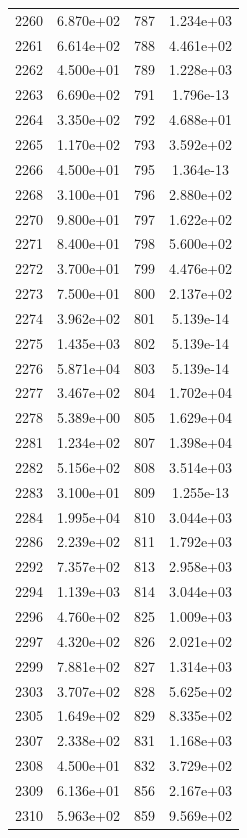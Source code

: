 \documentclass[12pt]{article}
\begin{document}
\begin{longtable}{@{}cccc@{}}
2260 & 6.870e+02 & 787 & 1.234e+03 \\
2261 & 6.614e+02 & 788 & 4.461e+02 \\
2262 & 4.500e+01 & 789 & 1.228e+03 \\
2263 & 6.690e+02 & 791 & 1.796e-13 \\
2264 & 3.350e+02 & 792 & 4.688e+01 \\
2265 & 1.170e+02 & 793 & 3.592e+02 \\
2266 & 4.500e+01 & 795 & 1.364e-13 \\
2268 & 3.100e+01 & 796 & 2.880e+02 \\
2270 & 9.800e+01 & 797 & 1.622e+02 \\
2271 & 8.400e+01 & 798 & 5.600e+02 \\
2272 & 3.700e+01 & 799 & 4.476e+02 \\
2273 & 7.500e+01 & 800 & 2.137e+02 \\
2274 & 3.962e+02 & 801 & 5.139e-14 \\
2275 & 1.435e+03 & 802 & 5.139e-14 \\
2276 & 5.871e+04 & 803 & 5.139e-14 \\
2277 & 3.467e+02 & 804 & 1.702e+04 \\
2278 & 5.389e+00 & 805 & 1.629e+04 \\
2281 & 1.234e+02 & 807 & 1.398e+04 \\
2282 & 5.156e+02 & 808 & 3.514e+03 \\
2283 & 3.100e+01 & 809 & 1.255e-13 \\
2284 & 1.995e+04 & 810 & 3.044e+03 \\
2286 & 2.239e+02 & 811 & 1.792e+03 \\
2292 & 7.357e+02 & 813 & 2.958e+03 \\
2294 & 1.139e+03 & 814 & 3.044e+03 \\
2296 & 4.760e+02 & 825 & 1.009e+03 \\
2297 & 4.320e+02 & 826 & 2.021e+02 \\
2299 & 7.881e+02 & 827 & 1.314e+03 \\
2303 & 3.707e+02 & 828 & 5.625e+02 \\
2305 & 1.649e+02 & 829 & 8.335e+02 \\
2307 & 2.338e+02 & 831 & 1.168e+03 \\
2308 & 4.500e+01 & 832 & 3.729e+02 \\
2309 & 6.136e+01 & 856 & 2.167e+03 \\
2310 & 5.963e+02 & 859 & 9.569e+02 \\

\bottomrule
\end{longtable}
\end{document}
